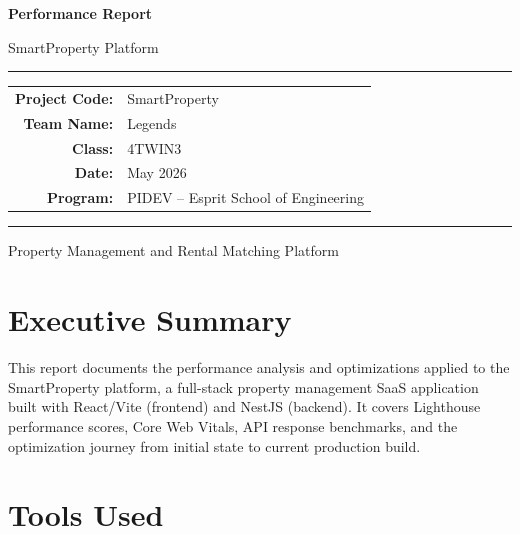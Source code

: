 \documentclass[12pt,a4paper]{article}
\begin{document}
\begin{titlepage}
    \centering
    \vspace*{2cm}
    {\Huge\bfseries\textcolor{primaryblue}{Performance Report}\par}
    \vspace{0.5cm}
    {\LARGE\textcolor{primaryblue!70}{SmartProperty Platform}\par}
    \vspace{2cm}
    \rule{\textwidth}{1pt}\par
    \vspace{1cm}
    \begin{tabular}{rl}
        \textbf{Project Code:} & SmartProperty \\[0.3em]
        \textbf{Team Name:}    & Legends \\[0.3em]
        \textbf{Class:}        & 4TWIN3 \\[0.3em]
        \textbf{Date:}         & May 2026 \\[0.3em]
        \textbf{Program:}      & PIDEV -- Esprit School of Engineering \\
    \end{tabular}
    \vspace{1cm}\par
    \rule{\textwidth}{1pt}
    \vfill
    {\large Property Management and Rental Matching Platform\par}
    \vspace{1cm}
\end{titlepage}

\tableofcontents
\newpage

\section{Executive Summary}

This report documents the performance analysis and optimizations applied to the SmartProperty platform, a full-stack property management SaaS application built with React/Vite (frontend) and NestJS (backend). It covers Lighthouse performance scores, Core Web Vitals, API response benchmarks, and the optimization journey from initial state to current production build.

\section{Tools Used}
\end{document}
